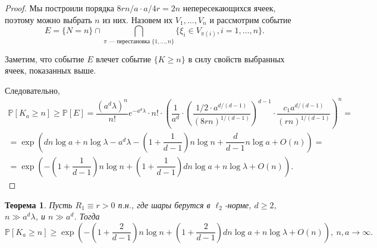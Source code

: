 \documentclass[12pt]{article}
\theoremstyle{plain}
\newtheorem{thm}{Теорема} %
\theoremstyle{definition}
\theoremstyle{remark}
\def\geq{\geqslant}
\newcommand{\PP}{\mathbb{P}}
\begin{document}
\begin{proof}
    
    Мы построили порядка $8rn/a \cdot a/4r = 2n$ непересекающихся ячеек, поэтому можно выбрать $n$ из них. Назовем их $V_1, \ldots, V_n$  и рассмотрим событие $$E = \{N=n\}\cap \bigcap\limits_{\pi \text{ --- перестановка } \{1, \ldots, n\}} \{\xi_i \in V_{\pi(i)}, i = 1, \ldots, n\}.$$
                         
    Заметим, что событие $E$ влечет событие $\{K \geq n\}$ в силу свойств выбранных ячеек, показанных выше.
  
    Следовательно, 
    \begin{multline*}
        \PP[K_a\geq n] \geq \PP[E] = \dfrac{(a^d\lambda)^n}{n!}e^{-a^d\lambda}\cdot n!\cdot \left(\dfrac{1}{a^d}\cdot\left(\dfrac{1/2\cdot a^{d/(d-1)}}{(8rn)^{1/(d-1)}}\right)^{d-1}\cdot \dfrac{c_1a^{d/(d-1)}}{(rn)^{1/(d-1)}}\right)^n = \\
        =\exp\left(dn\log a + n\log\lambda - a^d\lambda - \left(1+\dfrac{1}{d-1}\right)n\log n + \dfrac{d}{d-1} n\log a  + O(n)\right) =\\
        =\exp\left(-\left(1 + \dfrac{1}{d-1}\right)n\log n + \left(1 + \dfrac{1}{d-1}\right)dn\log a + n\log\lambda + O(n)\right).
    \end{multline*}{}
\end{proof}{}

\begin{thm}\label{lowconst2}
Пусть $R_1\equiv r > 0$ п.н., где шары берутся в $\ell_2$-норме, $d\geq 2$,  $n \gg a^d\lambda$, и $n\gg a^d$. 
Тогда $$\PP[K_a \geq n] \geq \exp \left(-\left(1+\dfrac{2}{d-1}\right)n\log n + \left(1+\dfrac{2}{d-1}\right)dn\log a  +n\log\lambda + O(n)\right),\  n, a\to \infty.$$
\end{thm}{}
\end{document}
